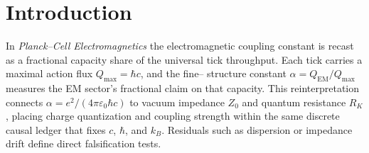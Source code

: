 \section*{Introduction}

In \emph{Planck--Cell Electromagnetics} the electromagnetic coupling constant is
recast as a fractional capacity share of the universal tick throughput.
Each tick carries a maximal action flux $Q_{\max} = \hbar c$, and the fine--
structure constant $\alpha = Q_{\mathrm{EM}}/Q_{\max}$ measures the EM sector's
fractional claim on that capacity.  This reinterpretation connects
$\alpha = e^2/(4\pi\varepsilon_0\hbar c)$ to vacuum impedance $Z_0$ and quantum
resistance $R_K$, placing charge quantization and coupling strength within the
same discrete causal ledger that fixes $c$, $\hbar$, and $k_B$.  Residuals such
as dispersion or impedance drift define direct falsification tests.
